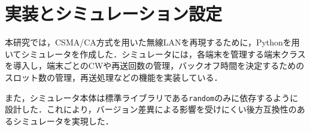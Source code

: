 \documentclass[a4paper, 10pt]{ltjsarticle}
\begin{document}




\section{実装とシミュレーション設定}

本研究では，CSMA/CA方式を用いた無線LANを再現するために，Pythonを用いてシミュレータを作成した．シミュレータには，各端末を管理する端末クラスを導入し，端末ごとのCWや再送回数の管理，バックオフ時間を決定するためのスロット数の管理，再送処理などの機能を実装している．

また，シミュレータ本体は標準ライブラリである\texttt{random}のみに依存するように設計した．これにより，バージョン差異による影響を受けにくい後方互換性のあるシミュレータを実現した．


\end{document}
